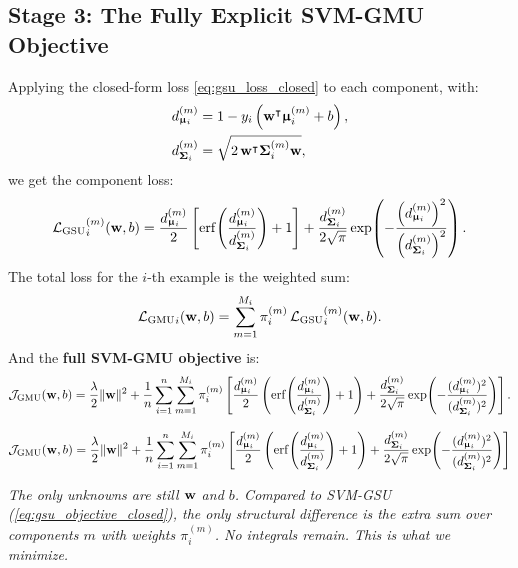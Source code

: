 \documentclass[11pt, letterpaper]{article}
\newcommand{\bSigma}{\vb{\Sigma}}
\newcommand{\bmu}{\boldsymbol{\upmu}}
\newcommand{\loss}{\mathcal{L}}
\newcommand{\obj}{\mathcal{J}}
\begin{document}
\subsection{Stage 3: The Fully Explicit SVM-GMU Objective}

Applying the closed-form loss \cref{eq:gsu_loss_closed} to each component, with:
\begin{align}
    d_{\bmu_i}^{(m)} &= 1 - y_i\left(\vb{w}^{\intercal} \bmu_i^{(m)} + b\right), \label{eq:dmu_m}\\
    d_{\bSigma_i}^{(m)} &= \sqrt{2\, \vb{w}^{\intercal} \bSigma_i^{(m)} \vb{w}}, \label{eq:dsigma_m}
\end{align}
we get the component loss:
\begin{equation}\label{eq:component_loss}
    {\loss_{\text{GSU}}}_{i}^{(m)}(\vb{w}, b) = \frac{d_{\bmu_i}^{(m)}}{2}\left[\mathrm{erf}\!\left(\frac{d_{\bmu_i}^{(m)}}{d_{\bSigma_i}^{(m)}}\right) + 1\right] + \frac{d_{\bSigma_i}^{(m)}}{2\sqrt{\pi}}\exp\!\left(-\frac{\left(d_{\bmu_i}^{(m)}\right)^2}{\left(d_{\bSigma_i}^{(m)}\right)^2}\right).
\end{equation}
The total loss for the $i$-th example is the weighted sum:
\begin{equation}\label{eq:gmu_loss}
    {\loss_{\text{GMU}}}_{i}(\vb{w}, b) = \sum_{m=1}^{M_i} \pi_i^{(m)}\, {\loss_{\text{GSU}}}_{i}^{(m)}(\vb{w}, b).
\end{equation}
And the \textbf{full SVM-GMU objective} is:
\begin{equation}\label{eq:gmu_objective}
    \obj_{\text{GMU}}(\vb{w}, b) = \frac{\lambda}{2}\|\vb{w}\|^2
    + \frac{1}{n}\sum_{i=1}^{n}\sum_{m=1}^{M_i} \pi_i^{(m)}\left[\frac{d_{\bmu_i}^{(m)}}{2}\left(\mathrm{erf}\!\left(\frac{d_{\bmu_i}^{(m)}}{d_{\bSigma_i}^{(m)}}\right) + 1\right) + \frac{d_{\bSigma_i}^{(m)}}{2\sqrt{\pi}}\exp\!\left(-\frac{(d_{\bmu_i}^{(m)})^2}{(d_{\bSigma_i}^{(m)})^2}\right)\right].
\end{equation}

\begin{statusbox}
\vspace{-0.5em}
\begin{equation*}
    \obj_{\text{GMU}}(\vb{w}, b) = \frac{\lambda}{2}\|\vb{w}\|^2
    + \frac{1}{n}\sum_{i=1}^{n}\sum_{m=1}^{M_i} \pi_i^{(m)}\left[\frac{d_{\bmu_i}^{(m)}}{2}\left(\mathrm{erf}\!\left(\frac{d_{\bmu_i}^{(m)}}{d_{\bSigma_i}^{(m)}}\right) + 1\right) + \frac{d_{\bSigma_i}^{(m)}}{2\sqrt{\pi}}\exp\!\left(-\frac{(d_{\bmu_i}^{(m)})^2}{(d_{\bSigma_i}^{(m)})^2}\right)\right]
\end{equation*}
\vspace{-1em}
\begin{center}\small
\emph{The only unknowns are still $\vb{w}$ and $b$. Compared to SVM-GSU (\cref{eq:gsu_objective_closed}), the only structural difference is the extra sum over components $m$ with weights $\pi_i^{(m)}$. No integrals remain. This is what we minimize.}
\end{center}
\end{statusbox}
\end{document}
